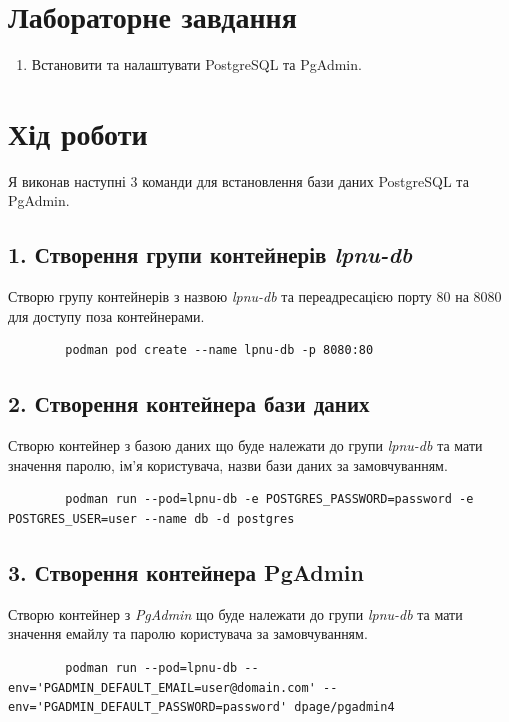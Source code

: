 \documentclass[14pt]{extreport}
\begin{document}
\begin{normalsize}
	\section*{Лабораторне завдання}
	\begin{enumerate}
		\item Встановити та налаштувати PostgreSQL та PgAdmin.
	\end{enumerate}
	
	\section*{Хід роботи}
	Я виконав наступні 3 команди для встановлення бази даних PostgreSQL та PgAdmin.
	\subsection*{1. Створення групи контейнерів \textit{lpnu-db}}
	Створю групу контейнерів з назвою \textit{lpnu-db} та переадресацією порту 80 на 8080 для доступу поза контейнерами.
	\begin{lstlisting}
		podman pod create --name lpnu-db -p 8080:80
	\end{lstlisting}
	
	\subsection*{2. Створення контейнера бази даних}
	Створю контейнер з базою даних що буде належати до групи \textit{lpnu-db} та мати значення паролю, ім'я користувача, назви бази даних за замовчуванням.
	\begin{lstlisting}
		podman run --pod=lpnu-db -e POSTGRES_PASSWORD=password -e POSTGRES_USER=user --name db -d postgres
	\end{lstlisting}
	
	\subsection*{3. Створення контейнера PgAdmin}
	Створю контейнер з \textit{PgAdmin} що буде належати до групи \textit{lpnu-db} та мати значення емайлу та паролю користувача за замовчуванням.
	\begin{lstlisting}
		podman run --pod=lpnu-db --env='PGADMIN_DEFAULT_EMAIL=user@domain.com' --env='PGADMIN_DEFAULT_PASSWORD=password' dpage/pgadmin4
	\end{lstlisting}
	

\end{normalsize}
\end{document}
